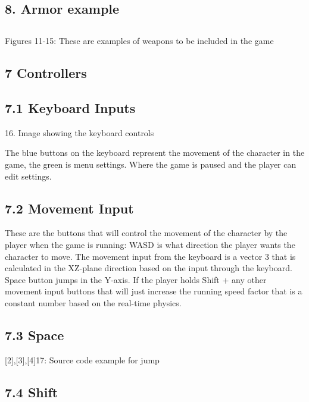 \documentclass{article}
\begin{document}
\begin{titlepage}
\subsection{ 8. Armor example                                          }
         
 


\subsection{}
Figures 11-15: These are examples of weapons to be included in the game

\subsection{ 7 Controllers }

\subsection{ 7.1 Keyboard Inputs }


16. Image showing the keyboard controls

The blue buttons on the keyboard represent the movement of the character in the game, the green is menu settings. Where the game is paused and the player can edit settings. 

\subsection{ 7.2 Movement Input }
These are the buttons that will control the movement of the character by the player when the game is running: WASD is what direction the player wants the character to move. The movement input from the keyboard is a vector 3 that is calculated in the XZ-plane direction based on the input through the keyboard. Space button jumps in the Y-axis. If the player holds Shift + any other movement input buttons that will just increase the running speed factor that is a constant number based on the real-time physics. 

\subsection{ 7.3 Space }


    [2],[3],[4]17: Source code example for jump
\subsection{ 7.4 Shift }


\end{titlepage}
\end{document}
